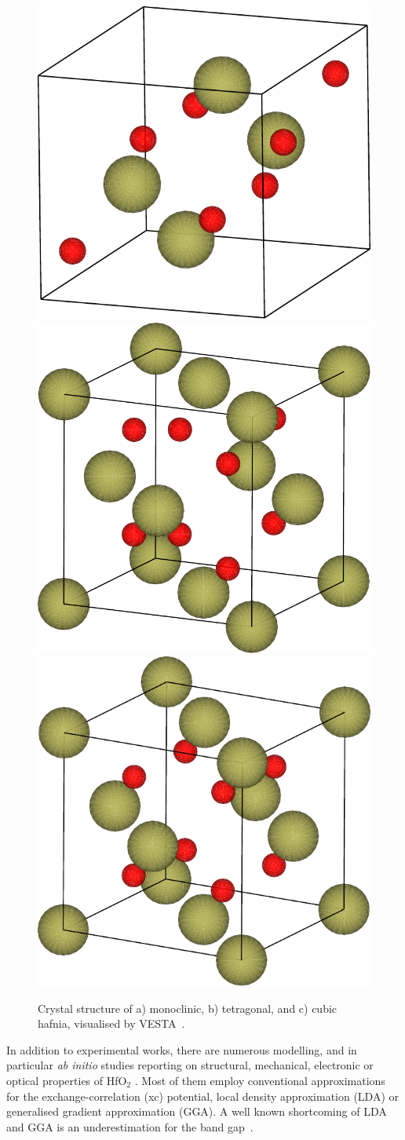 \documentclass[10pt,a4paper,twocolumn]{article}
\begin{document}
\begin{figure}[b]
   \begin{center}
   \includegraphics[width=0.3\linewidth]{figures/monoclinic.pdf}
   \includegraphics[width=0.3\linewidth]{figures/tetragonal.pdf}
   \includegraphics[width=0.3\linewidth]{figures/cubic.pdf}
   \caption{Crystal structure of a) monoclinic, b) tetragonal, and c) cubic hafnia, visualised by VESTA~\cite{Momma2011}.}
   \label{structs}
   \end{center}
\end{figure}

In addition to experimental works, there are numerous modelling, and in particular \textit{ab initio} studies reporting on structural, mechanical, electronic or optical properties of HfO$_2$ \cite{Caravaca2005, Broqvist2007, Ceresoli2006, Garcia2004, Kaneta2007, Liu2009, Scopel2008, Terki2008, Zhao2002, Gruning2010}.
Most of them employ conventional approximations for the exchange-correlation (xc) potential, local density approximation (LDA) or generalised gradient approximation (GGA).
A well known shortcoming of LDA and GGA is an underestimation for the band gap~\cite{Tran2009,Koller2011-hd,Koller2012}.

\end{document}
